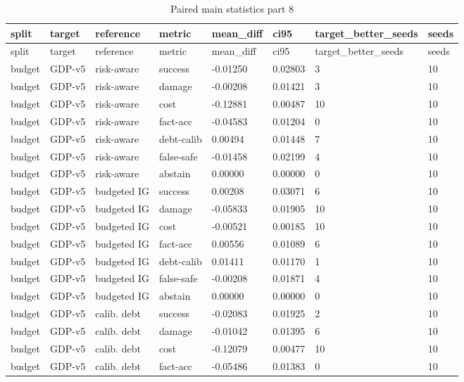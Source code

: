 \documentclass{article}
\begin{document}
\begin{center}
\tiny
\renewcommand{\arraystretch}{0.92}
\setlength{\tabcolsep}{3pt}
\begin{longtable}{llllllll}
\caption{Paired main statistics part 8}\label{tab:paired-main-statistics-8}\\
\toprule
split & target & reference & metric & mean\_diff & ci95 & target\_better\_seeds & seeds \\
\midrule
\endfirsthead
\toprule
split & target & reference & metric & mean\_diff & ci95 & target\_better\_seeds & seeds \\
\midrule
\endhead
budget & GDP-v5 & risk-aware & success & -0.01250 & 0.02803 & 3 & 10 \\
budget & GDP-v5 & risk-aware & damage & -0.00208 & 0.01421 & 3 & 10 \\
budget & GDP-v5 & risk-aware & cost & -0.12881 & 0.00487 & 10 & 10 \\
budget & GDP-v5 & risk-aware & fact-acc & -0.04583 & 0.01204 & 0 & 10 \\
budget & GDP-v5 & risk-aware & debt-calib & 0.00494 & 0.01448 & 7 & 10 \\
budget & GDP-v5 & risk-aware & false-safe & -0.01458 & 0.02199 & 4 & 10 \\
budget & GDP-v5 & risk-aware & abstain & 0.00000 & 0.00000 & 0 & 10 \\
budget & GDP-v5 & budgeted IG & success & 0.00208 & 0.03071 & 6 & 10 \\
budget & GDP-v5 & budgeted IG & damage & -0.05833 & 0.01905 & 10 & 10 \\
budget & GDP-v5 & budgeted IG & cost & -0.00521 & 0.00185 & 10 & 10 \\
budget & GDP-v5 & budgeted IG & fact-acc & 0.00556 & 0.01089 & 6 & 10 \\
budget & GDP-v5 & budgeted IG & debt-calib & 0.01411 & 0.01170 & 1 & 10 \\
budget & GDP-v5 & budgeted IG & false-safe & -0.00208 & 0.01871 & 4 & 10 \\
budget & GDP-v5 & budgeted IG & abstain & 0.00000 & 0.00000 & 0 & 10 \\
budget & GDP-v5 & calib. debt & success & -0.02083 & 0.01925 & 2 & 10 \\
budget & GDP-v5 & calib. debt & damage & -0.01042 & 0.01395 & 6 & 10 \\
budget & GDP-v5 & calib. debt & cost & -0.12079 & 0.00477 & 10 & 10 \\
budget & GDP-v5 & calib. debt & fact-acc & -0.05486 & 0.01383 & 0 & 10 \\

\end{longtable}
\end{center}
\end{document}
